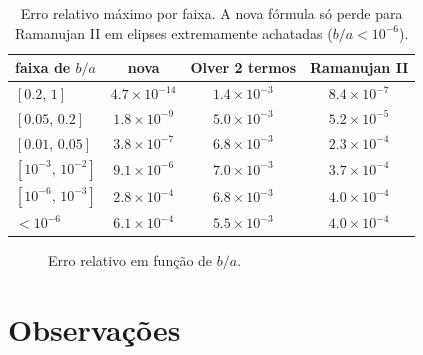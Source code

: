 \documentclass[11pt,a4paper]{article}
\theoremstyle{remark}
\begin{document}
\begin{table}[H]
\centering
\begin{tabular}{lccc}
\toprule
faixa de $b/a$ & nova & Olver 2 termos & Ramanujan II\\
\midrule
$[0.2,\,1]$       & $4.7\times10^{-14}$ & $1.4\times10^{-3}$ & $8.4\times10^{-7}$\\
$[0.05,\,0.2]$    & $1.8\times10^{-9}$  & $5.0\times10^{-3}$ & $5.2\times10^{-5}$\\
$[0.01,\,0.05]$   & $3.8\times10^{-7}$  & $6.8\times10^{-3}$ & $2.3\times10^{-4}$\\
$[10^{-3},\,10^{-2}]$ & $9.1\times10^{-6}$ & $7.0\times10^{-3}$ & $3.7\times10^{-4}$\\
$[10^{-6},\,10^{-3}]$ & $2.8\times10^{-4}$ & $6.8\times10^{-3}$ & $4.0\times10^{-4}$\\
$<10^{-6}$        & $6.1\times10^{-4}$ & $5.5\times10^{-3}$ & $4.0\times10^{-4}$\\
\bottomrule
\end{tabular}
\caption{Erro relativo máximo por faixa. A nova fórmula só perde para Ramanujan II
em elipses extremamente achatadas ($b/a<10^{-6}$).}
\end{table}

\begin{figure}[H]
\centering
{}
\caption{Erro relativo em função de $b/a$.}
\end{figure}

\section{Observações}
\end{document}
